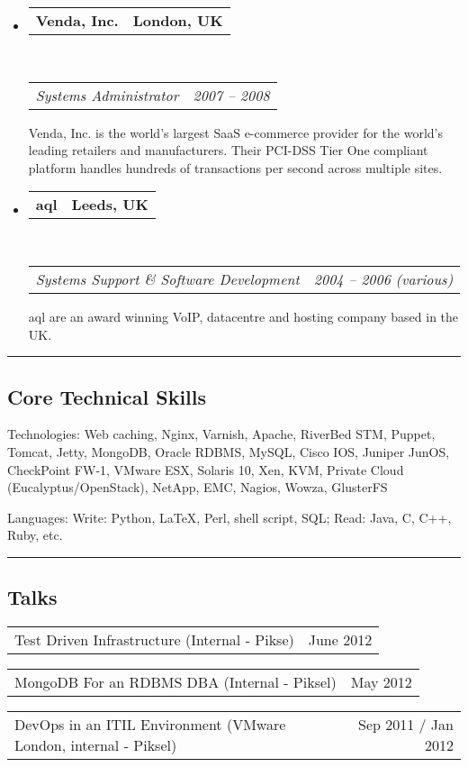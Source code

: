 \documentclass[10pt,a4paper]{article}
\makeatletter
\newenvironment{indentsection}[1]%
{\begin{list}{}%
    {\setlength{\leftmargin}{#1}}%
    \item[]%
}
{\end{list}}
\newcommand{\headerrow}[2]
{\begin{tabular*}{\linewidth}{l@{\extracolsep{\fill}}r}
    #1 &
    #2 \\
\end{tabular*}}
\makeatother
\begin{document}
\begin{itemize}
    \item
        \headerrow
            {\textbf{Venda, Inc.}}
            {\textbf{London, UK}}
        \\
        \headerrow
            {\emph{Systems Administrator}}
            {\emph{2007 -- 2008}}
    
            Venda, Inc. is the world's largest SaaS e-commerce provider for the world's leading retailers and manufacturers. Their PCI-DSS Tier One compliant platform handles hundreds of transactions per second across multiple sites.
    \item
        \headerrow
            {\textbf{aql}}
            {\textbf{Leeds, UK}}
        \\
        \headerrow
            {\emph{Systems Support \& Software Development}}
            {\emph{2004 -- 2006 (various)}}
    
            aql are an award winning VoIP, datacentre and hosting company based in the UK.
\end{itemize}


\hrule
\vspace{-0.4em}
\subsection*{Core Technical Skills}

\begin{indentsection}{\parindent}
\begin{description*}
    \item[Technologies:]
    Web caching, Nginx, Varnish, Apache, RiverBed STM, Puppet, Tomcat, Jetty, MongoDB, Oracle RDBMS, MySQL, Cisco IOS, Juniper JunOS, CheckPoint FW-1, VMware ESX, Solaris 10, Xen, KVM, Private Cloud (Eucalyptus/OpenStack), NetApp, EMC, Nagios, Wowza, GlusterFS
    \item[Languages:]
    Write: Python, \LaTeX, Perl, shell script, SQL; Read: Java, C, C++, Ruby, etc.
\end{description*}
\end{indentsection}


\hrule
\vspace{-0.4em}
\subsection*{Talks}
    \headerrow
        {Test Driven Infrastructure (Internal - Pikse)}
        {June 2012}
    \headerrow
        {MongoDB For an RDBMS DBA (Internal - Piksel)}
        {May 2012}
    \headerrow
        {DevOps in an ITIL Environment (VMware London, internal - Piksel)}
        {Sep 2011 / Jan 2012}
\end{document}

